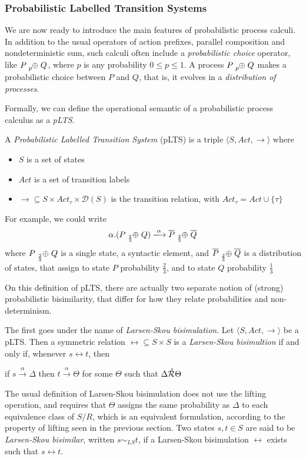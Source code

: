 \subsubsection{Probabilistic Labelled Transition Systems}

We are now ready to introduce the main features of probabilistic process calculi. In addition to the usual operators of action prefixes, parallel composition and nondeterministic sum, such calculi often include a \textit{probabilistic choice} operator, like $P \psum{p} Q$, where $p$ is any probability $0 \leq p \leq 1$. A process $P \psum{p} Q$ makes a probabilistic choice between $P$ and $Q$, that is, it evolves in a \textit{distribution of processes}.

Formally, we can define the operational semantic of a probabilistic process calculus as a \textit{pLTS}.
	
A \textit{Probabilistic Labelled Transition System} (pLTS) is a triple $\langle S , Act, \rightarrow \rangle$ where \begin{itemize}
\item $S$ is a set of states
\item $Act$ is a set of transition labels
\item $\rightarrow 	\subseteq S\times Act_\tau \times \mathcal{D}(S)$ is the transition relation, with $Act_\tau = Act \cup \{\tau\}$
\end{itemize} 
 For example, we could write 
\[\alpha.(P \psum{\frac{2}{3}} Q) \xlongrightarrow{\alpha} \overline{P} \psum{\frac{2}{3}} \overline{Q}\]
where $P \psum{\frac{2}{3}} Q$ is a single state, a syntactic element, and $\overline{P} \psum{\frac{2}{3}} \overline{Q}$ is a distribution of states, that assign to state $P$ probability $\frac{2}{3}$, and to state $Q$ probability $\frac{1}{3}$


On this definition of pLTS, there are actually two separate notion of (strong) probabilistic bisimilarity, that differ for how they relate probabilities and non-determinism.

The first goes under the name of \textit{Larsen-Skou bisimulation}. Let $\langle S , Act, \rightarrow \rangle$ be a pLTS. Then a symmetric relation $\rel \subseteq S \times S$ is a \textit{Larsen-Skou bisimultion} if and only if, whenever $s \rel t$, then 
\begin{center}
if $s \xrightarrow{\alpha} \Delta$ then $t \xrightarrow{\alpha} \Theta$ for some $\Theta$ such that $\Delta \mathring{\mathcal{R}} \Theta$
\end{center}
The usual definition of Larsen-Skou bisimulation does not use the lifting operation, and requires that $\Theta$ assigns the same probability as $\Delta$ to each equivalence class of $S/R$, which is an equivalent formulation, according to the property of lifting seen in the previous section. Two states $s, t \in S$ are said to be \textit{Larsen-Skou bisimilar}, written $s \sim_{LS} t$, if a Larsen-Skou bisimulation $\rel$ exists such that $s \rel t$.

